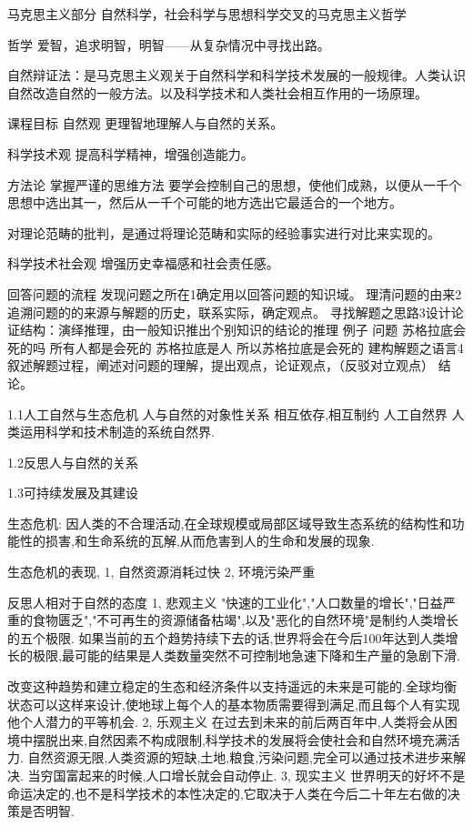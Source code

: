 \documentclass[a4paper]{book}
\numberwithin{equation}{chapter}
\theoremstyle{definition}
\begin{document}
	
	马克思主义部分
	自然科学，社会科学与思想科学交叉的马克思主义哲学
	
	哲学
	爱智，追求明智，明智——从复杂情况中寻找出路。
	
	
	自然辩证法：是马克思主义观关于自然科学和科学技术发展的一般规律。人类认识自然改造自然的一般方法。以及科学技术和人类社会相互作用的一场原理。
	
	
	
	课程目标
	自然观
	更理智地理解人与自然的关系。
	
	科学技术观
	提高科学精神，增强创造能力。
	
	方法论
	掌握严谨的思维方法
	要学会控制自己的思想，使他们成熟，以便从一千个思想中选出其一，然后从一千个可能的地方选出它最适合的一个地方。
	
	对理论范畴的批判，是通过将理论范畴和实际的经验事实进行对比来实现的。
	
	科学技术社会观
	增强历史幸福感和社会责任感。
	
	
	
	回答问题的流程
	发现问题之所在1确定用以回答问题的知识域。
	理清问题的由来2追溯问题的的来源与解题的历史，联系实际，确定观点。
	寻找解题之思路3设计论证结构：演绎推理，由一般知识推出个别知识的结论的推理 例子
	问题 苏格拉底会死的吗
	所有人都是会死的
	苏格拉底是人
	所以苏格拉底是会死的
	建构解题之语言4叙述解题过程，阐述对问题的理解，提出观点，论证观点，（反驳对立观点）
	结论。
	
	
	1.1人工自然与生态危机
	人与自然的对象性关系  相互依存,相互制约
	人工自然界  人类运用科学和技术制造的系统自然界.
	
	1.2反思人与自然的关系
	
	
	1.3可持续发展及其建设
	
	生态危机:
	因人类的不合理活动,在全球规模或局部区域导致生态系统的结构性和功能性的损害,和生命系统的瓦解,从而危害到人的生命和发展的现象.
	
	生态危机的表现,
	1, 自然资源消耗过快
	2, 环境污染严重
	
	反思人相对于自然的态度
	1, 悲观主义
	"快速的工业化","人口数量的增长","日益严重的食物匮乏","不可再生的资源储备枯竭",以及"恶化的自然环境"是制约人类增长的五个极限.
	如果当前的五个趋势持续下去的话,世界将会在今后100年达到人类增长的极限,最可能的结果是人类数量突然不可控制地急速下降和生产量的急剧下滑.
	
	改变这种趋势和建立稳定的生态和经济条件以支持遥远的未来是可能的.全球均衡状态可以这样来设计,使地球上每个人的基本物质需要得到满足,而且每个人有实现他个人潜力的平等机会.
	2, 乐观主义
	在过去到未来的前后两百年中,人类将会从困境中摆脱出来,自然因素不构成限制,科学技术的发展将会使社会和自然环境充满活力.
	自然资源无限,人类资源的短缺,土地,粮食,污染问题,完全可以通过技术进步来解决.
	当穷国富起来的时候,人口增长就会自动停止.
	3, 现实主义
	世界明天的好坏不是命运决定的,也不是科学技术的本性决定的,它取决于人类在今后二十年左右做的决策是否明智.
	
\end{document}
